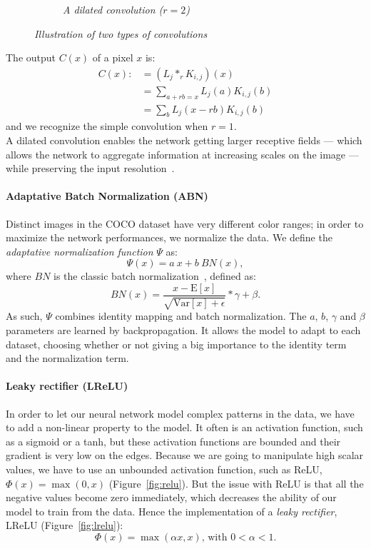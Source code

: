\documentclass{article}
\begin{document}
\begin{figure}[!ht]
\begin{subfigure}{.49\linewidth}
                    \caption{\textit{A dilated convolution ($r=2$)}}
                    \label{fig:conv-dilated}
                \end{subfigure}
                \caption{\textit{Illustration of two types of convolutions}}
            \end{figure}

            \noindent The output $C(x)$ of a pixel $x$ is:
            \begin{align*}
            C(x):& = (L_j*_r K_{i,j})(x) \\
                 & = \sum_{a+rb=x}L_j(a)K_{i,j}(b) \\
                 & = \sum_b L_j(x-rb)K_{i,j}(b)
            \end{align*}
            and we recognize the simple convolution when $r=1$.\\
            A dilated convolution enables the network getting larger receptive fields --- which allows the network to aggregate information at increasing scales on the image --- while preserving the input resolution~\cite{ref}.


            \paragraph{Adaptative Batch Normalization (ABN)} Distinct images in the COCO dataset have very different color ranges; in order to maximize the network performances, we normalize the data. We define the \textit{adaptative normalization function} $\Psi$ as:
            $$\Psi(x)=a\ x+b\ BN(x),$$
            where $BN$ is the classic batch normalization~\cite{abn}, defined as:
            $$BN(x) = \frac{x-\mathrm{E}[x]}{\sqrt{\mathrm{Var}[x]+\epsilon}}*\gamma+\beta.$$
            As such, $\Psi$ combines identity mapping and batch normalization. The $a$, $b$, $\gamma$ and $\beta$ parameters are learned by backpropagation. It allows the model to adapt to each dataset, choosing whether or not giving a big importance to the identity term and the normalization term.

            \paragraph{Leaky rectifier (LReLU)} In order to let our neural network model complex patterns in the data, we have to add a non-linear property to the model. It often is an activation function, such as a sigmoid or a tanh, but these activation functions are bounded and their gradient is very low on the edges. Because we are going to manipulate high scalar values, we have to use an unbounded activation function, such as ReLU, $\Phi(x)=\max(0,x)$ (Figure~\ref{fig:relu}). But the issue with ReLU is that all the negative values become zero immediately, which decreases the ability of our model to train from the data. Hence the implementation of a \textit{leaky rectifier}, LReLU (Figure~\ref{fig:lrelu}):
            $$\Phi(x)=\max(\alpha x,x)\mbox{, with } 0<\alpha<1.$$
\end{document}

